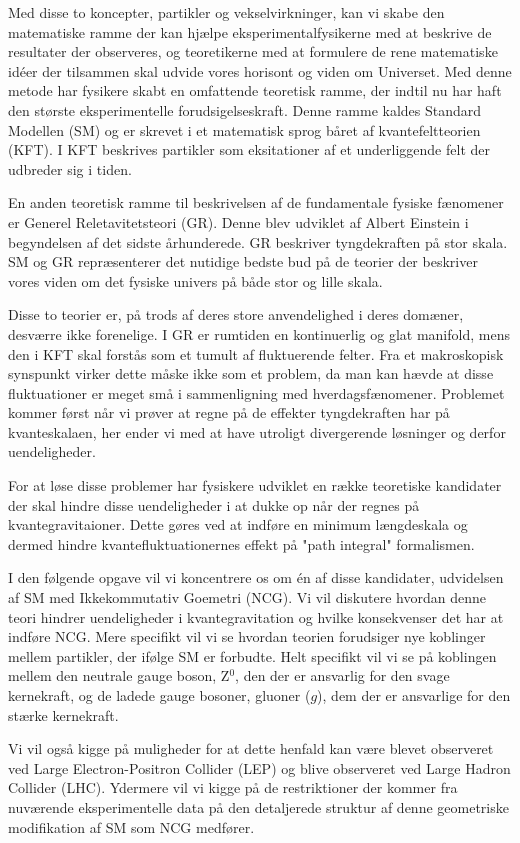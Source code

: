 Med disse to koncepter, partikler og vekselvirkninger, kan vi skabe den matematiske ramme der kan hjælpe eksperimentalfysikerne med at beskrive de resultater der observeres, og teoretikerne med at formulere de rene matematiske idéer der tilsammen skal udvide vores horisont og viden om Universet. Med denne metode har fysikere skabt en omfattende teoretisk ramme, der indtil nu har haft den største eksperimentelle forudsigelseskraft. Denne ramme kaldes Standard Modellen (SM) og er skrevet i et matematisk sprog båret af kvantefeltteorien (KFT). I KFT beskrives partikler som eksitationer af et underliggende felt der udbreder sig i tiden.

En anden teoretisk ramme til beskrivelsen af de fundamentale fysiske fænomener er Generel Reletavitetsteori (GR). Denne blev udviklet af Albert Einstein i begyndelsen af det sidste århunderede. GR beskriver tyngdekraften på stor skala. SM og GR repræsenterer det nutidige bedste bud på de teorier der beskriver vores viden om det fysiske univers på både stor og lille skala.

Disse to teorier er, på trods af deres store anvendelighed i deres domæner, desværre ikke forenelige. I GR er rumtiden en kontinuerlig og glat manifold, mens den i KFT skal forstås som et tumult af fluktuerende felter. Fra et makroskopisk synspunkt virker dette måske ikke som et problem, da man kan hævde at disse fluktuationer er meget små i sammenligning med hverdagsfænomener. Problemet kommer først når vi prøver at regne på de effekter tyngdekraften har på kvanteskalaen, her ender vi med at have utroligt divergerende løsninger og derfor uendeligheder.

For at løse disse problemer har fysiskere udviklet en række teoretiske kandidater der skal hindre disse uendeligheder i at dukke op når der regnes på kvantegravitaioner. Dette gøres ved at indføre en minimum længdeskala og dermed hindre kvantefluktuationernes effekt på "path integral" formalismen.

I den følgende opgave vil vi koncentrere os om én af disse kandidater, udvidelsen af SM med Ikkekommutativ Goemetri (NCG). Vi vil diskutere hvordan denne teori hindrer uendeligheder i kvantegravitation og hvilke konsekvenser det har at indføre NCG. Mere specifikt vil vi se hvordan teorien forudsiger nye koblinger mellem partikler, der ifølge SM er forbudte. Helt specifikt vil vi se på koblingen mellem den neutrale gauge boson, Z$^{0}$, den der er ansvarlig for den svage kernekraft, og de ladede gauge bosoner, gluoner ($g$), dem der er ansvarlige for den stærke kernekraft.

Vi vil også kigge på muligheder for at dette henfald kan være blevet observeret ved Large Electron-Positron Collider (LEP) og blive observeret ved Large Hadron Collider (LHC). Ydermere vil vi kigge på de restriktioner der kommer fra nuværende eksperimentelle data på den detaljerede struktur af denne geometriske modifikation af SM som NCG medfører.
